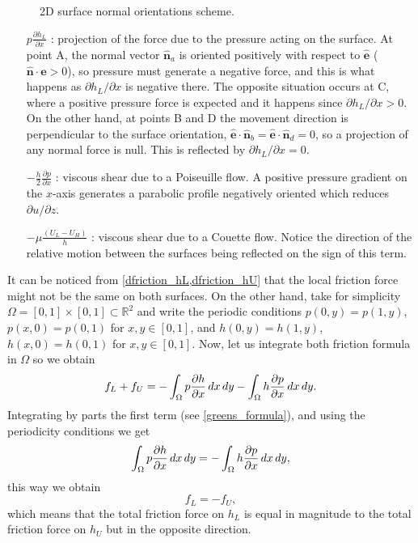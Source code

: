  \begin{figure}[ht]
 \centering 
 \def\svgwidth{\textwidth}	
\caption[2D surface normal orientations scheme]{2D surface normal orientations scheme.}\label{fig:dimpleshear}	
\end{figure}

\hspace*{1.1cm}
\begin{minipage}[H]{0.92 \textwidth}
\begin{itemize}
\item[$p\frac{\partial h_L}{\partial x}$ :] projection of the force due to the pressure acting on the surface. At point A, the normal vector $\mathbf{\hat{n}}_a$ is oriented positively with respect to $\mathbf{\hat{e}}$ ($\mathbf{\hat{n}}\cdot \mathbf{\hat{e}}>0$), so pressure must generate a negative force, and this is what happens as $\partial h_L / \partial x$ is negative there. The opposite situation occurs at C, where a positive pressure force is expected  and it happens since $\partial h_L / \partial x>0$. On the other hand, at points B and D the movement direction is perpendicular to the surface orientation, $\mathbf{\hat{e}}\cdot \mathbf{\hat{n}}_b=\mathbf{\hat{e}}\cdot\mathbf{\hat{n}}_d=0$, so a projection of any normal force is null. This is reflected by $\partial h_L/\partial x=0$.

\item[$-\frac{h}{2}\frac{\partial p}{\partial x}$ :] viscous shear due to a Poiseuille flow. A positive pressure gradient on the $x$-axis generates a parabolic profile negatively oriented which reduces $\partial u / \partial z$.

\item[$-\mu\frac{(U_L-U_H)}{h}$ :] viscous shear due to a Couette flow. Notice the direction of the relative motion between the surfaces being reflected on the sign of this term.
\end{itemize}
\end{minipage}

\bigskip
It can be noticed from \eqref{dfriction_hL,dfriction_hU} that the local friction force might not be the same on both surfaces. On the other hand, take for simplicity $\Omega=[0,1]\times [0,1]\subset \mathbb{R}^2$ 
and write the periodic conditions $p(0,y)=p(1,y)$, $p(x,0)=p(0,1)$ for $x,y\in[0,1]$, and $h(0,y)=h(1,y)$, $h(x,0)=h(0,1)$ for $x,y\in[0,1]$. Now, let us integrate both friction formula in $\Omega$ so we obtain
$$f_L+f_U=-\int_\Omega  p\frac{\partial h}{\partial x}\,dx\,dy-\int_\Omega h\frac{\partial p}{\partial x}\,dx\,dy.$$
Integrating by parts the first term (see \eqref{greens_formula}), and using the periodicity conditions we get $$\int_\Omega p \frac{\partial h}{\partial x} \,dx\,dy= -\int_\Omega h \frac{\partial p}{\partial x} \,dx\,dy,$$
this way we obtain
$$f_L=-f_U,$$
which means that the total friction force on $h_L$ is equal in magnitude to the total friction force on $h_U$ but in the opposite direction.
